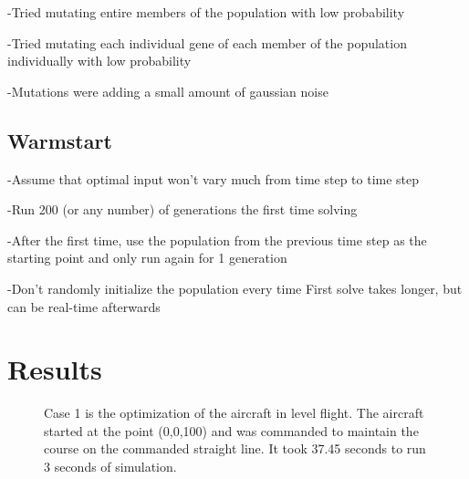 \documentclass[letterpaper, 10 pt, conference]{ieeeconf}  %
\begin{document}
-Tried mutating entire members of the population with low probability

-Tried mutating each individual gene of each member of the population individually with low probability

-Mutations were adding a small amount of gaussian noise


\subsection{Warmstart}

-Assume that optimal input won’t vary much from time step to time step

-Run 200 (or any number) of generations the first time solving

-After the first time, use the population from the previous time step as the starting point and only run again for 1 generation

-Don’t randomly initialize the population every time
First solve takes longer, but can be real-time afterwards


\section{Results}


\begin{figure}[htbp]
	\centering
	\qquad
	\caption{Case 1 is the optimization of the aircraft in level flight. The aircraft started at the point (0,0,100) and was commanded to maintain the course on the commanded straight line. It took 37.45 seconds to run 3 seconds of simulation.}
	\label{fig:fw_level}
\end{figure}
\end{document}
